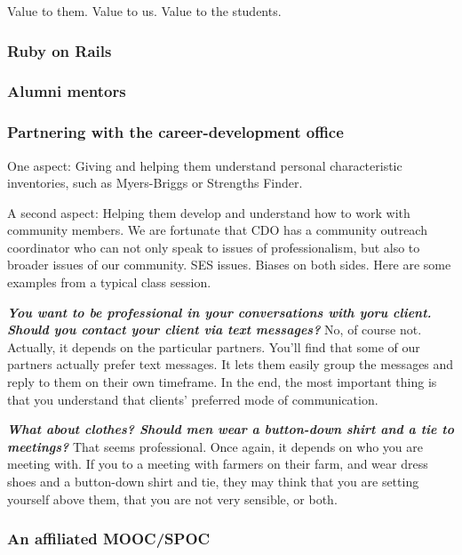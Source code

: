 Value to them.  Value to us.  Value to the students.

\subsubsection{Ruby on Rails}

\subsubsection{Alumni mentors}

\subsubsection{Partnering with the career-development office}

One aspect: Giving and helping them understand personal characteristic
inventories, such as Myers-Briggs or Strengths Finder.

A second aspect: Helping them develop and understand how to work with
community members.  We are fortunate that CDO has a community outreach
coordinator who can not only speak to issues of professionalism, but
also to broader issues of our community.  SES issues.  Biases on both
sides.  Here are some examples from a typical class session.

\newcommand{\question}[1]{\textbf{\textsl{#1}}}
\newcommand{\answer}[1]{#1}
\newcommand{\followup}[1]{#1}

\question{You want to be professional in your conversations with yoru client.  Should you contact your client via text messages?}
\answer{No, of course not.}
\followup{Actually, it depends on the particular partners.  You'll find that some of our partners actually prefer text messages.  It lets them easily group the messages and reply to them on their own timeframe.  In the end, the most important thing is that you understand that clients' preferred mode of communication.}

\question{What about clothes?  Should men wear a button-down shirt and a tie to meetings?}
\answer{That seems professional.}
\followup{Once again, it depends on who you are meeting with.  If you to a meeting with farmers on their farm, and wear dress shoes and a button-down shirt and tie, they may think that you are setting yourself above them, that you are not very sensible, or both.}

\subsubsection{An affiliated MOOC/SPOC}

